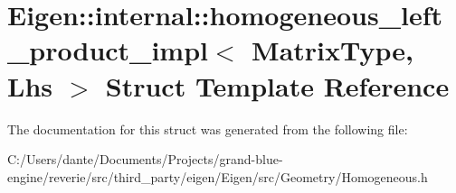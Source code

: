 \hypertarget{struct_eigen_1_1internal_1_1homogeneous__left__product__impl}{}\section{Eigen\+::internal\+::homogeneous\+\_\+left\+\_\+product\+\_\+impl$<$ Matrix\+Type, Lhs $>$ Struct Template Reference}
\label{struct_eigen_1_1internal_1_1homogeneous__left__product__impl}


The documentation for this struct was generated from the following file\+:\begin{DoxyCompactItemize}
\item 
C\+:/\+Users/dante/\+Documents/\+Projects/grand-\/blue-\/engine/reverie/src/third\+\_\+party/eigen/\+Eigen/src/\+Geometry/Homogeneous.\+h\end{DoxyCompactItemize}
